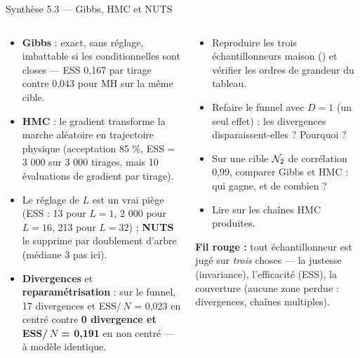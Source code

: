 \begin{frame}{Synthèse 5.3 --- Gibbs, HMC et NUTS}
\footnotesize
\begin{columns}[t]
\begin{column}{0.52\textwidth}
\begin{tcolorbox}[enhanced,colback=byPurple!7,colframe=byPurple,arc=2mm,
   title={\bfseries\color{white}\faLightbulb\ Synthèse},colbacktitle=byPurple,
   attach boxed title to top left={xshift=3mm,yshift=-2mm},
   boxed title style={arc=1mm,boxrule=0pt}]
\begin{itemize}
  \item \textbf{Gibbs} : exact, sans réglage, imbattable si les conditionnelles
        sont closes --- ESS 0,167 par tirage contre 0,043 pour MH sur la même cible.
  \item \textbf{HMC} : le gradient transforme la marche aléatoire en trajectoire
        physique (acceptation 85 \%, ESS = 3 000 sur 3 000 tirages, mais
        10 évaluations de gradient par tirage).
  \item Le réglage de $L$ est un vrai piège (ESS : 13 pour $L = 1$, 2 000 pour
        $L = 16$, 213 pour $L = 32$) ; \textbf{NUTS} le supprime par doublement
        d'arbre (médiane 3 pas ici).
  \item \textbf{Divergences} et \textbf{reparamétrisation} : sur le funnel,
        17 divergences et ESS/\,$N$ = 0,023 en centré contre \textbf{0 divergence
        et ESS/\,$N$ = 0,191} en non centré --- à modèle identique.
\end{itemize}
\end{tcolorbox}
\end{column}
\begin{column}{0.46\textwidth}
\begin{abox}
\begin{itemize}
  \item Reproduire les trois échantillonneurs maison
        () et vérifier les ordres de grandeur du tableau.
  \item Refaire le funnel avec $D = 1$ (un seul effet) : les divergences
        disparaissent-elles ? Pourquoi ?
  \item Sur une cible $\mathcal{N}_2$ de corrélation 0,99, comparer Gibbs et HMC :
        qui gagne, et de combien ?
  \item Lire  sur les chaînes HMC produites.
\end{itemize}
\end{abox}
\begin{tcolorbox}[colback=byCyan!8,colframe=byCyan,arc=2mm]
\small\textbf{Fil rouge :} tout échantillonneur est jugé sur \emph{trois}
choses --- la justesse (invariance), l'efficacité (ESS), la couverture
(aucune zone perdue : divergences, chaînes multiples).
\end{tcolorbox}
\end{column}
\end{columns}
\end{frame}
